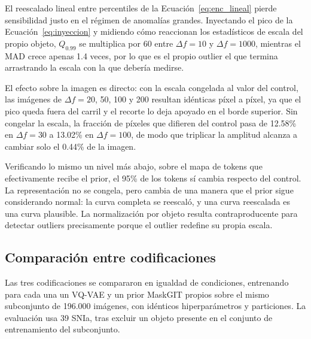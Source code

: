 El reescalado lineal entre percentiles de la Ecuación~\ref{eq:enc_lineal} pierde sensibilidad justo en el régimen de anomalías grandes. Inyectando el pico de la Ecuación~\ref{eq:inyeccion} y midiendo cómo reaccionan los estadísticos de escala del propio objeto, $Q_{0.99}$ se multiplica por 60 entre $\Delta f = 10$ y $\Delta f = 1000$, mientras el MAD crece apenas 1.4 veces, por lo que es el propio outlier el que termina arrastrando la escala con la que debería medirse.

El efecto sobre la imagen es directo: con la escala congelada al valor del control, las imágenes de $\Delta f = 20$, 50, 100 y 200 resultan idénticas píxel a píxel, ya que el pico queda fuera del carril y el recorte lo deja apoyado en el borde superior. Sin congelar la escala, la fracción de píxeles que difieren del control pasa de 12.58\% en $\Delta f = 30$ a 13.02\% en $\Delta f = 100$, de modo que triplicar la amplitud alcanza a cambiar solo el 0.44\% de la imagen.

\begin{figure}[H]
\centering
{}
\end{figure}

Verificando lo mismo un nivel más abajo, sobre el mapa de tokens que efectivamente recibe el prior, el 95\% de los tokens sí cambia respecto del control. La representación no se congela, pero cambia de una manera que el prior sigue considerando normal: la curva completa se reescaló, y una curva reescalada es una curva plausible. La normalización por objeto resulta contraproducente para detectar outliers precisamente porque el outlier redefine su propia escala.

\subsection{Comparación entre codificaciones}

Las tres codificaciones se compararon en igualdad de condiciones, entrenando para cada una un VQ-VAE y un prior MaskGIT propios sobre el mismo subconjunto de 196.000 imágenes, con idénticos hiperparámetros y particiones. La evaluación usa 39 SNIa, tras excluir un objeto presente en el conjunto de entrenamiento del subconjunto.

